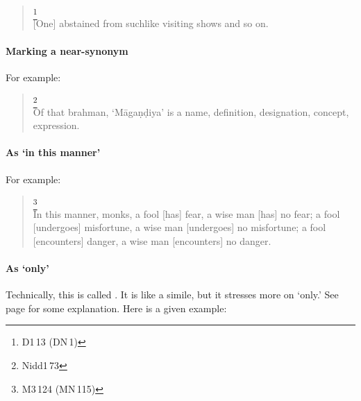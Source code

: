 \begin{quote}
\footnote{D1\,13 (DN\,1)}\\
{[One] abstained from suchlike visiting shows and so on.}\\
\end{quote}

\paragraph*{Marking a near-synonym} For example:

\begin{quote}
\footnote{Nidd1\,73}\\
Of that brahman, `M\=aga\d n\d diya' is a name, definition, designation, concept, expression.\\
\end{quote}

\paragraph*{As `in this manner'} For example:

\begin{quote}
\footnote{M3\,124 (MN\,115)}\\
In this manner, monks, a fool [has] fear, a wise man [has] no fear; a fool [undergoes] misfortune, a wise man [undergoes] no misfortune; a fool [encounters] danger, a wise man [encounters] no danger.\\
\end{quote}

\paragraph*{As `only'} Technically, this is called . It is like a simile, but it stresses more on `only.' See page \pageref{par:samasa-avadh} for some explanation. Here is a given example:

